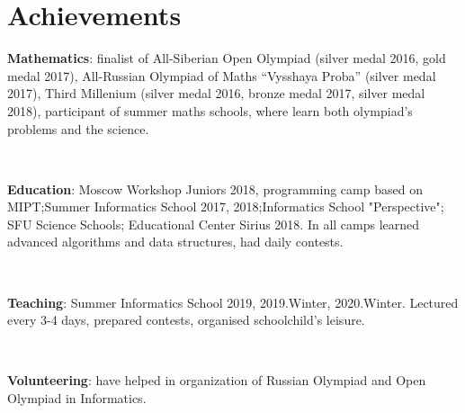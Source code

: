 \documentclass[letterpaper,11pt]{article}
\begin{document}
\section{\textbf{Achievements}}
 \begin{itemize}[leftmargin=0.15in, label={}]
    \small{\item{
     \textbf{Mathematics}{: finalist of All-Siberian Open Olympiad (silver medal 2016, gold medal 2017), All-Russian Olympiad of Maths “Vysshaya Proba” (silver medal 2017), Third Millenium (silver medal 2016, bronze medal 2017, silver medal 2018), participant of summer maths schools, where learn both olympiad's problems and the science.}}}\\
     \small{\item{
     \textbf{Education}{: Moscow Workshop Juniors 2018, programming camp based on MIPT;\quad Summer Informatics School 2017, 2018;\quad Informatics School "Perspective"; SFU Science Schools; Educational Center Sirius 2018. In all camps learned advanced algorithms and data structures, had daily contests. }}}\\
     \small{\item{
     \textbf{Teaching}{: Summer Informatics School 2019, 2019.Winter, 2020.Winter. Lectured every 3-4 days, prepared contests, organised schoolchild's leisure. }}} \\
     \small{\item{
     \textbf{Volunteering}{: have helped in organization of Russian Olympiad and Open Olympiad in Informatics.} \\
    }}
    
 \end{itemize}
\end{document}
